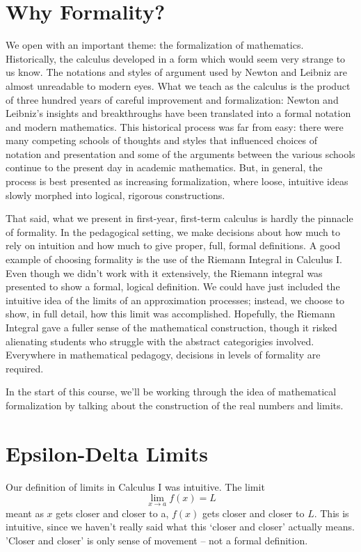 \documentclass[fleqn]{report}
\begin{document}
\section{Why Formality?}
\label{why-formality}

We open with an important theme: the formalization of mathematics.
Historically, the calculus developed in a form which would
seem very strange to us know. The notations and styles of
argument used by Newton and Leibniz are almost unreadable to
modern eyes. What we teach as the calculus is the product of
three hundred years of careful improvement and formalization: 
Newton and Leibniz's insights and breakthroughs have been
translated into a formal notation and modern mathematics.
This historical process was far from easy: there
were many competing schools of thoughts and styles that
influenced choices of notation and presentation and some of the
arguments between the various schools continue to the present
day in academic mathematics. But, in general, the process is
best presented as increasing formalization, where loose,
intuitive ideas slowly morphed into logical, rigorous
constructions.

That said, what we present in first-year, first-term calculus
is hardly the pinnacle of formality. In the pedagogical
setting, we make decisions about how much to rely on intuition
and how much to give proper, full, formal definitions. A good
example of choosing formality is the use of the Riemann
Integral in Calculus I. Even though we didn't work with it
extensively, the Riemann integral was presented to show a
formal, logical definition. We could have just included the
intuitive idea of the limits of an approximation processes;
instead, we choose to show, in full detail, how this limit was
accomplished. Hopefully, the Riemann Integral gave a fuller
sense of the mathematical construction, though it risked
alienating students who struggle with the abstract
categorigies involved. Everywhere in
mathematical pedagogy, decisions in levels of formality are
required.

In the start of this course, we'll be working through the idea
of mathematical formalization by talking about the
construction of the real numbers and limits.

\section{Epsilon-Delta Limits}
\label{epsilon-delta}

Our definition of limits in Calculus I was intuitive. The
limit
\begin{equation*}
\lim_{x \rightarrow a} f(x) = L
\end{equation*}
meant as $x$ gets closer and closer to a, $f(x)$ gets
closer and closer to $L$. This is intuitive, since we haven't
really said what this `closer and closer' actually means.
'Closer and closer' is only sense of movement -- not a 
formal definition.
\end{document}
